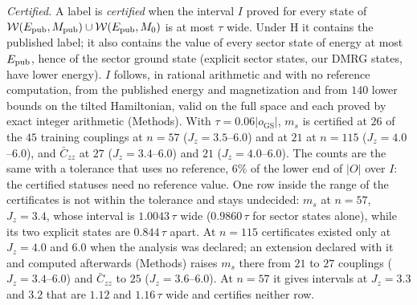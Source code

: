 \documentclass[aps,prx,twocolumn,10pt,superscriptaddress,nofootinbib,longbibliography,floatfix]{revtex4-2}
\theoremstyle{remark}
\newcommand{\Jz}{J_z}
\newcommand{\ms}{m_s}
\newcommand{\Czz}{\bar C_{zz}}
\newcommand{\W}{\mathcal{W}}
\newcommand{\GS}{\mathrm{GS}}
\begin{document}
\emph{Certified.} A label is \emph{certified} when the interval $I$ proved for every state of
$\W(E_{\rm pub},M_{\rm pub})\cup\W(E_{\rm pub},M_0)$ is at most $\tau$ wide. Under H it contains the published label; it
also contains the value of every sector state of energy at most $E_{\rm pub}$, hence of the sector ground state
(explicit sector states, our DMRG states, have lower energy). $I$ follows, in rational arithmetic and with no
reference computation, from the published energy and magnetization and from $140$ lower bounds on the tilted %
Hamiltonian, valid on the full space and each proved by exact integer arithmetic (Methods). With
$\tau=0.06|o_\GS|$, $\ms$ is certified at $26$ of the $45$ training couplings at $n=57$ ($\Jz=3.5$--$6.0$) and at $21$ %
at $n=115$ ($\Jz=4.0$--$6.0$), and $\Czz$ at $27$ ($\Jz=3.4$--$6.0$) and $21$ ($\Jz=4.0$--$6.0$). The counts are the %
same with a tolerance that uses no reference, $6\%$ of the lower end of $|O|$ over $I$: the certified statuses need %
no reference value. One row inside the range of the certificates is not within the tolerance and stays undecided: $\ms$ at $n=57$,
$\Jz=3.4$, whose interval is $1.0043\,\tau$ wide ($0.9860\,\tau$ for sector states alone), while its two explicit %
states are $0.844\,\tau$ apart. At $n=115$ certificates %
existed only at $\Jz=4.0$ and $6.0$ when the analysis was declared; an extension declared with it and computed
afterwards (Methods) raises $\ms$ there from $21$ to $27$ couplings %
($\Jz=3.4$--$6.0$) and $\Czz$ to $25$ ($\Jz=3.6$--$6.0$). At $n=57$ it gives intervals at $\Jz=3.3$ and $3.2$ that are %
$1.12$ and $1.16\,\tau$ wide and certifies neither row. %
\end{document}
